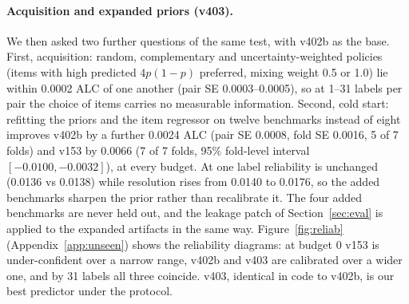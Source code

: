 \documentclass{article}
\begin{document}
\paragraph{Acquisition and expanded priors (v403).}
\label{sec:v403}
We then asked two further questions of the same test, with v402b as the base. First, acquisition: random, complementary and uncertainty-weighted policies (items with high predicted $4p(1-p)$ preferred, mixing weight 0.5 or 1.0) lie within 0.0002 ALC of one another (pair SE 0.0003--0.0005), so at 1--31 labels per pair the choice of items carries no measurable information. Second, cold start: refitting the priors and the item regressor on twelve benchmarks instead of eight improves v402b by a further 0.0024 ALC (pair SE 0.0008, fold SE 0.0016, 5 of 7 folds) and v153 by 0.0066 (7 of 7 folds, 95\% fold-level interval $[-0.0100,-0.0032]$), at every budget. At one label reliability is unchanged (0.0136 vs 0.0138) while resolution rises from 0.0140 to 0.0176, so the added benchmarks sharpen the prior rather than recalibrate it. The four added benchmarks are never held out, and the leakage patch of Section~\ref{sec:eval} is applied to the expanded artifacts in the same way. Figure~\ref{fig:reliab} (Appendix~\ref{app:unseen}) shows the reliability diagrams: at budget 0 v153 is under-confident over a narrow range, v402b and v403 are calibrated over a wider one, and by 31 labels all three coincide. v403, identical in code to v402b, is our best predictor under the protocol.
\end{document}
